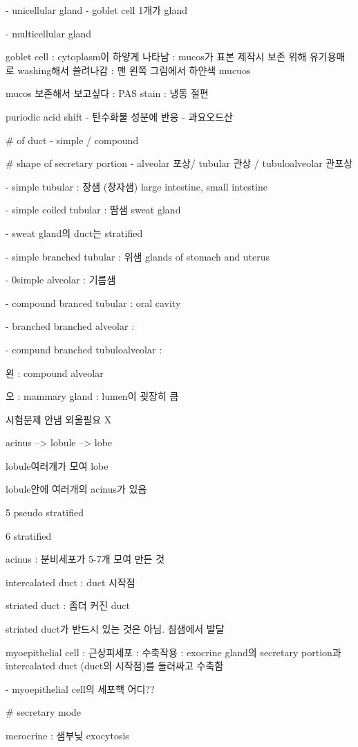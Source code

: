 \documentclass[10pt]{amsart}
\numberwithin{theorem}{section}
\numberwithin{example}{section}
\theoremstyle{definition}
\theoremstyle{remark}
\begin{document}
- unicellular gland - goblet cell 1개가 gland 

- multicellular gland 

goblet cell : cytoplasm이 하얗게 나타남 : mucos가 표본 제작시 보존 위해 유기용매로 washing해서 쓸려나감 : 맨 왼쪽 그림에서 하얀색 mucuos 

mucos 보존해서 보고싶다 : PAS stain :  냉동 절편 

puriodic acid shift -  탄수화물 성분에 반응 - 과요오드산 

# of duct - simple / compound


# shape of secretary portion - alveolar 포상/ tubular 관상 / tubuloalveolar 관포상


- simple tubular : 장샘 (창자샘) large intestine, small intestine 

- simple coiled tubular : 땀샘 sweat gland 

- sweat gland의 duct는 stratified

- simple branched tubular : 위샘 glands of stomach and uterus

- 0simple alveolar : 기름샘

- compound branced tubular : oral cavity

- branched branched alveolar : 

- compund branched tubuloalveolar : 

왼 : compound alveolar

오 : mammary gland : lumen이 굊장히 큼 

시험문제 안냄 외울필요 X


acinus --> lobule --> lobe 

lobule여러개가 모여 lobe

lobule안에 여러개의 acinus가 있음 

5 pseudo stratified

6 stratified

acinus : 분비세포가 5-7개 모여 만든 것 

intercalated duct : duct 시작점 

striated duct : 좀더 커진 duct 

striated duct가 반드시 있는 것은 아님. 침샘에서 발달 

myoepithelial cell : 근상피세포 : 수축작용 : exocrine gland의 secretary portion과 intercalated duct (duct의 시작점)를 둘러싸고 수축함

- myoepithelial cell의 세포핵 어디??


# secretary mode 

merocrine : 샘부닞 exocytosis
\end{document}
